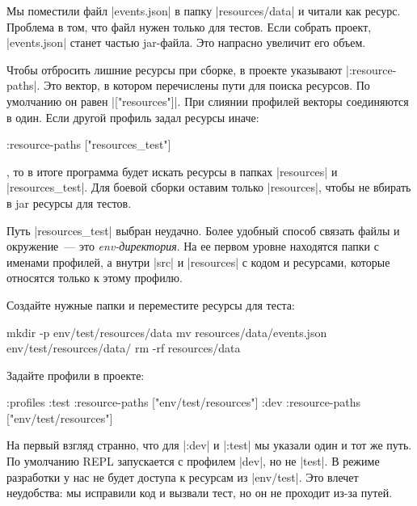Мы поместили файл \spverb|events.json| в папку \spverb|resources/data| и читали
как ресурс. Проблема в том, что файл нужен только для тестов. Если собрать
проект, \spverb|events.json| станет частью jar-файла. Это напрасно увеличит его
объем.

Чтобы отбросить лишние ресурсы при сборке, в проекте указывают
\spverb|:resource-paths|. Это вектор, в котором перечислены пути для поиска
ресурсов. По умолчанию он равен \spverb|["resources"]|. При слиянии профилей
векторы соединяются в один. Если другой профиль задал ресурсы иначе:

\begin{english}
  \begin{clojure}
:resource-paths ["resources_test"]
  \end{clojure}
\end{english}

\noindent
, то в итоге программа будет искать ресурсы в папках \spverb|resources| и
\spverb|resources_test|. Для боевой сборки оставим только \spverb|resources|,
чтобы не вбирать в jar ресурсы для тестов.

Путь \spverb|resources_test| выбран неудачно. Более удобный способ связать файлы
и окружение~--- это \emph{env-директория}. На ее первом уровне находятся папки с
именами профилей, а внутри \spverb|src| и \spverb|resources| с кодом и
ресурсами, которые относятся только к этому профилю.

Создайте нужные папки и переместите ресурсы для теста:

\begin{english}
  \begin{bash}
mkdir -p env/test/resources/data
mv resources/data/events.json env/test/resources/data/
rm -rf resources/data
  \end{bash}
\end{english}

Задайте профили в проекте:

\begin{english}
  \begin{clojure}
:profiles {:test {:resource-paths ["env/test/resources"]}
           :dev  {:resource-paths ["env/test/resources"]}}
  \end{clojure}
\end{english}

На первый взгляд странно, что для \spverb|:dev| и \spverb|:test| мы указали один
и тот же путь. По умолчанию REPL запускается с профилем \spverb|dev|, но не
\spverb|test|. В режиме разработки у нас не будет доступа к ресурсам из
\spverb|env/test|. Это влечет неудобства: мы исправили код и вызвали тест, но он
не проходит из-за путей.

